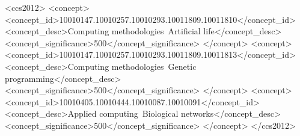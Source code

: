 \documentclass[sigconf]{acmart}
\begin{document}
%
%
\begin{CCSXML}
<ccs2012>
<concept>
<concept_id>10010147.10010257.10010293.10011809.10011810</concept_id>
<concept_desc>Computing methodologies~Artificial life</concept_desc>
<concept_significance>500</concept_significance>
</concept>
<concept>
<concept_id>10010147.10010257.10010293.10011809.10011813</concept_id>
<concept_desc>Computing methodologies~Genetic programming</concept_desc>
<concept_significance>500</concept_significance>
</concept>
<concept>
<concept_id>10010405.10010444.10010087.10010091</concept_id>
<concept_desc>Applied computing~Biological networks</concept_desc>
<concept_significance>500</concept_significance>
</concept>
</ccs2012>
\end{CCSXML}





\maketitle




 
\end{document}
